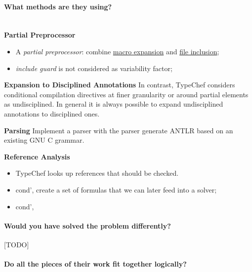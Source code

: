 \documentclass[12pt]{article}
\begin{document}
\paragraph{What methods are they using?}\mbox{}\\

\textbf{Partial Preprocessor}\\
\begin{itemize}
	\item A \textit{partial preprocessor}: combine \underline{macro expansion} and \underline{file inclusion}; 
	\item \textit{include guard} is not considered as variability factor;
\end{itemize}

\textbf{Expansion to Disciplined Annotations}
In contrast, TypeChef considers conditional compilation directives at finer granularity or around partial elements as undisciplined. In general it is always possible to expand undisciplined annotations to disciplined ones.

\textbf{Parsing} Implement a parser with the parser generate ANTLR based on an existing GNU C grammar.

\textbf{Reference Analysis}
\begin{itemize}
	\item TypeChef looks up references that should be checked.
	\item cond', create a set of formulas that we can later feed into a solver;
	\item cond', 
\end{itemize}



\paragraph{Would you have solved the problem differently?}[TODO]
\paragraph{Do all the pieces of their work fit together logically?}





\end{document}
